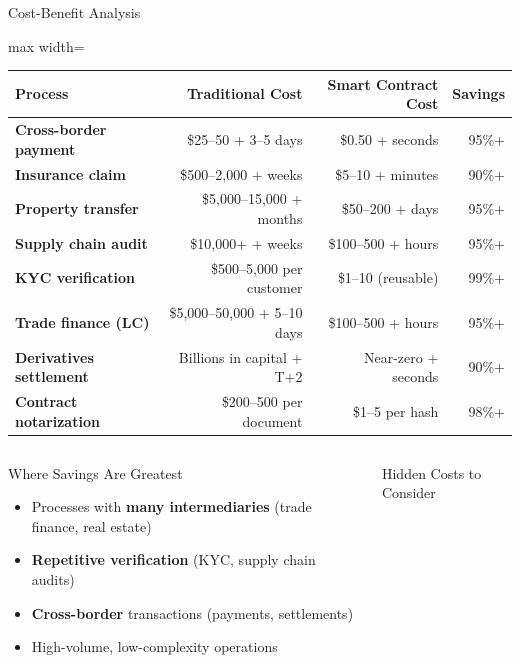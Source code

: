 \documentclass[8pt,aspectratio=169]{beamer}
\begin{document}
\begin{frame}{Cost-Benefit Analysis}
\centering
\vspace{-1mm}
\begin{adjustbox}{max width=\textwidth}
\begin{tabular}{>{\bfseries}l r r r}
\toprule
\textbf{Process} & \textbf{Traditional Cost} & \textbf{Smart Contract Cost} & \textbf{Savings} \\
\midrule
\rowcolor{mllavender4}
Cross-border payment & \$25--50 + 3--5 days & \$0.50 + seconds & 95\%+ \\
Insurance claim & \$500--2,000 + weeks & \$5--10 + minutes & 90\%+ \\
\rowcolor{mllavender4}
Property transfer & \$5,000--15,000 + months & \$50--200 + days & 95\%+ \\
Supply chain audit & \$10,000+ + weeks & \$100--500 + hours & 95\%+ \\
\rowcolor{mllavender4}
KYC verification & \$500--5,000 per customer & \$1--10 (reusable) & 99\%+ \\
Trade finance (LC) & \$5,000--50,000 + 5--10 days & \$100--500 + hours & 95\%+ \\
\rowcolor{mllavender4}
Derivatives settlement & Billions in capital + T+2 & Near-zero + seconds & 90\%+ \\
Contract notarization & \$200--500 per document & \$1--5 per hash & 98\%+ \\
\bottomrule
\end{tabular}
\end{adjustbox}
\vspace{4mm}
\begin{columns}[T]
\begin{exampleblock}{Where Savings Are Greatest}
\footnotesize
\begin{itemize}
  \item Processes with \textbf{many intermediaries} (trade finance, real estate)
  \item \textbf{Repetitive verification} (KYC, supply chain audits)
  \item \textbf{Cross-border} transactions (payments, settlements)
  \item High-volume, low-complexity operations
\end{itemize}
\end{exampleblock}
\begin{alertblock}{Hidden Costs to Consider}
\footnotesize
\begin{itemize}

\end{itemize}
\end{alertblock}
\end{columns}
\end{frame}
\end{document}
